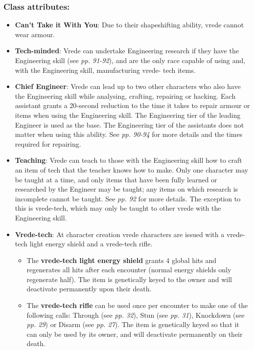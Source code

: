 \subsubsection{Class attributes:}

\begin{itemize}
\item \textbf{Can't Take it With You}: Due to their shapeshifting ability, vrede cannot wear armour.

\item \textbf{Tech-minded}: Vrede can undertake Engineering research if they have the Engineering skill (see \textit{pp. 91-92}), and are the only race capable of using and, with the Engineering skill, manufacturing vrede- tech items.

\item \textbf{Chief Engineer}: Vrede can lead up to two other characters who also have the Engineering skill while analysing, crafting, repairing or hacking. Each assistant grants a 20-second reduction to the time it takes to repair armour or items when using the Engineering skill. The Engineering tier of the leading Engineer is used as the base. The Engineering tier of the assistants does not matter when using this ability. See \textit{pp. 90-94} for more details and the times required for repairing.

\item \textbf{Teaching}: Vrede can teach to those with the Engineering skill how to craft an item of tech that the teacher knows how to make. Only one character may be taught at a time, and only items that have been fully learned or researched by the Engineer may be taught; any items on which research is incomplete cannot be taught. See \textit{pp. 92} for more details. The exception to this is vrede-tech, which may only be taught to other vrede with the Engineering skill.

\item \textbf{Vrede-tech}: At character creation vrede characters are issued with a vrede-tech light energy shield and a vrede-tech rifle.

\begin{itemize}
\item The \textbf{vrede-tech light energy shield} grants 4 global hits and regenerates all hits after each encounter (normal energy shields only regenerate half). The item is genetically keyed to the owner and will deactivate permanently upon their death.

\item The \textbf{vrede-tech rifle} can be used once per encounter to make one of the following calls: Through (see \textit{pp. 32}), Stun (see \textit{pp. 31}), Knockdown (see \textit{pp. 29}) or Disarm (see \textit{pp. 27}). The item is genetically keyed so that it can only be used by its owner, and will deactivate permanently on their death.

\end{itemize}

\end{itemize}

